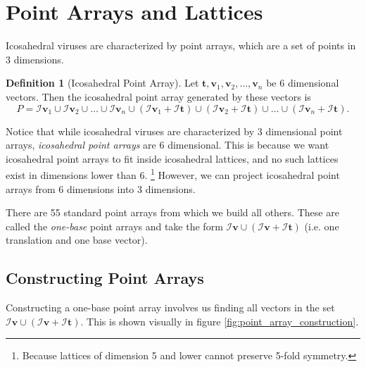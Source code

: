 \documentclass[a4paper,10pt]{article}
\theoremstyle{plain}
\theoremstyle{definition}
\newtheorem{Definition}[Theorem]{Definition}
\theoremstyle{remark}
\renewcommand{\vec}[1]{\textbf{#1}}
\begin{document}
\section{Point Arrays and Lattices}
Icosahedral viruses are characterized by point arrays, which are a set of points in 3 dimensions.
\begin{Definition}[Icosahedral Point Array]
    Let \(\vec{t}, \vec{v}_1, \vec{v}_2, \dots, \vec{v}_n\) be 6 dimensional vectors.
    Then the icosahedral point array generated by these vectors is \[P = \mathcal{I}\vec{v}_1 \cup \mathcal{I}\vec{v}_2 \cup \dots \cup \mathcal{I}\vec{v}_n \cup (\mathcal{I}\vec{v}_1 + \mathcal{I}\vec{t}) \cup (\mathcal{I}\vec{v}_2 + \mathcal{I}\vec{t}) \cup \dots \cup (\mathcal{I}\vec{v}_n + \mathcal{I}\vec{t}).\]
\end{Definition}
Notice that while icosahedral viruses are characterized by 3 dimensional point arrays, \emph{icosahedral point arrays} are 6 dimensional.
This is because we want icosahedral point arrays to fit inside icosahedral lattices, and no such lattices exist in dimensions lower than 6. \footnote{Because lattices of dimension 5 and lower cannot preserve 5-fold symmetry.}
However, we can project icosahedral point arrays from 6 dimensions into 3 dimensions.

There are 55 standard point arrays from which we build all others.
These are called the \emph{one-base} point arrays and take the form \(\mathcal{I}\vec{v} \cup (\mathcal{I}\vec{v} + \mathcal{I}\vec{t})\) (i.e. one translation and one base vector). \cite{keeftwarock2009affine}

\subsection{Constructing Point Arrays}
Constructing a one-base point array involves us finding all vectors in the set \(\mathcal{I}\vec{v} \cup (\mathcal{I}\vec{v} + \mathcal{I}\vec{t})\).
This is shown visually in figure \ref{fig:point_array_construction}.
\end{document}
